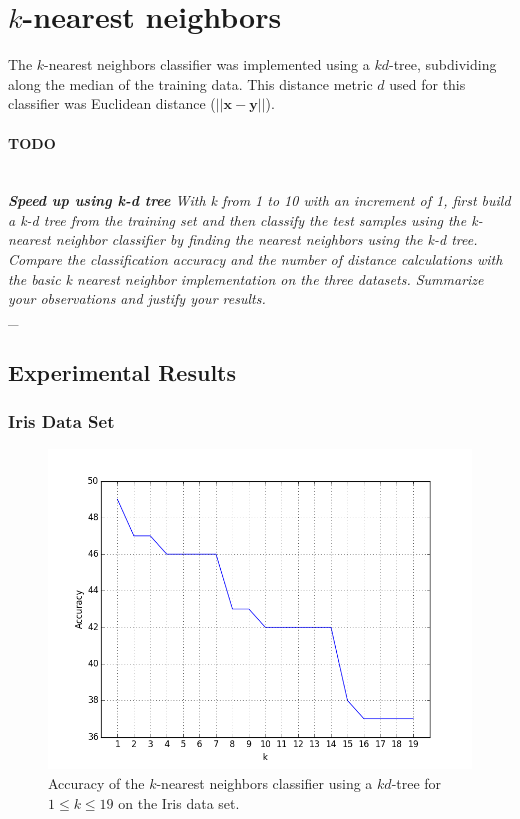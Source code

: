 \documentclass{article}
\numberwithin{figure}{section}
\newcommand{\bx}{\mathbf{x}}
\newcommand{\outline}[2]{\paragraph{\textsc{#1}}\hrulefill~\\{\small\it #2}\\\_\hrulefill}
\newcommand{\todo}[1]{\outline{\large TODO}{#1}}
\begin{document}
\section{$k$-nearest neighbors}
The $k$-nearest neighbors classifier was implemented using a $kd$-tree, subdividing along the median of the training data. This distance metric $d$ used for this classifier was Euclidean distance ($||\bx - \textbf{y}||$).

\todo{{\bf Speed up using k-d tree} With k from 1 to 10 with an increment of 1, first build a k-d tree from the training set and then classify the test samples using the k-nearest neighbor classifier by finding the nearest neighbors using the k-d tree. Compare the classification accuracy and the number of distance calculations with the basic k nearest neighbor implementation on the three datasets. Summarize your observations and justify your results.}

\subsection{Experimental Results}
\subsubsection{Iris Data Set}
\begin{figure}[H]
\centering
\includegraphics[width=.9\textwidth]{knn_kd_iris}
\caption{Accuracy of the $k$-nearest neighbors classifier using a $kd$-tree for $1 \leq k \leq 19$ on the Iris data set.}
\label{knn_iris}
\end{figure}
\end{document}
